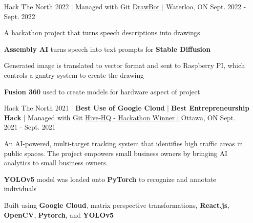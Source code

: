 \begin{cventries}

	\cventry
	{Hack The North 2022 | Managed with Git} %
	{\underline{\href{https://devpost.com/software/drawbot-ulof5z}{DrawBot | \ExternalLink}}} %
	{Waterloo, ON} %
	{Sept. 2022 - Sept. 2022} %
	{
		\begin{cvitems} %
			\item {A hackathon project that turns speech descriptions into drawings}
			\item {\textbf{Assembly AI} turns speech into text prompts for \textbf{Stable Diffusion}}
			\item {Generated image is translated to vector format and sent to Raspberry PI, which controls a gantry system to create the drawing}
			\item {\textbf{Fusion 360} used to create models for hardware aspect of project}
		\end{cvitems}
	}


	\cventry
	{Hack The North 2021 | \textbf{Best Use of Google Cloud} | \textbf{Best Entrepreneurship Hack} | Managed with Git} %
	{\underline{\href{https://devpost.com/software/hive-hq}{Hive-HQ - Hackathon Winner | \ExternalLink}}} %
	{Ottawa, ON} %
	{Sept. 2021 - Sept. 2021} %
	{
		\begin{cvitems} %
			\item {An AI-powered, multi-target tracking system that identifies high traffic areas in public spaces. The project empowers small business owners by bringing AI analytics to small business owners.}
			\item {\textbf{YOLOv5} model was loaded onto \textbf{PyTorch} to recognize and annotate individuals}
			\item {Built using \textbf{Google Cloud}, matrix perspective transformations, \textbf{React.js}, \textbf{OpenCV}, \textbf{Pytorch}, and \textbf{YOLOv5}}
		\end{cvitems}
	}


\end{cventries}
